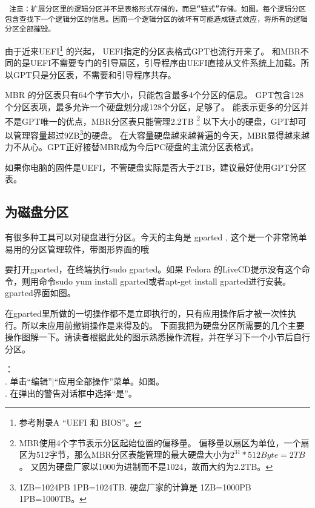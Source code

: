 \documentclass[amstex,twoside]{ctexbook}
\newenvironment{notice}{\tt}{}
\begin{document}
\begin{notice}
注意：扩展分区里的逻辑分区并不是表格形式存储的，而是“链式”存储。如图。每个逻辑分区包含查找下一个逻辑分区的信息。因而一个逻辑分区的破坏有可能造成链式效应，将所有的逻辑分区全部摧毁。
\end{notice}

由于近来UEFI\footnote{参考附录A “UEFI 和 BIOS”。}  的兴起，
UEFI指定的分区表格式GPT也流行开来了。
和MBR不同的是UEFI不需要专门的引导扇区，引导程序由UEFI直接从文件系统上加载。所以GPT只是分区表，不需要和引导程序共存。

MBR 的分区表只有64个字节大小，只能包含最多4个分区的信息。
GPT包含128个分区表项，最多允许一个硬盘划分成128个分区，足够了。
能表示更多的分区并不是GPT唯一的优点，MBR分区表只能管理2.2TB
\footnote{MBR使用4个字节表示分区起始位置的偏移量。
偏移量以扇区为单位，一个扇区为512字节，那么MBR分区表能管理的最大硬盘大小为$2^{31}*512Byte = 2TB$。
又因为硬盘厂家以1000为进制而不是1024，故而大约为2.2TB。}%
以下大小的硬盘，GPT却可以管理容量超过9ZB\footnote{1ZB=1024PB 1PB=1024TB. 硬盘厂家的计算是 1ZB=1000PB 1PB=1000TB。}的硬盘。
在大容量硬盘越来越普遍的今天，MBR显得越来越力不从心。GPT正好接替MBR成为今后PC硬盘的主流分区表格式。

如果你电脑的固件是UEFI，不管硬盘实际是否大于2TB，建议最好使用GPT分区表。

\subsection{为磁盘分区}


\FloatBarrier

\normalfont

有很多种工具可以对硬盘进行分区。今天的主角是 gparted , 这个是一个非常简单易用的分区管理软件，带图形界面的哦~~

要打开gparted，在终端执行sudo gparted。如果 Fedora 的LiveCD提示没有这个命令，则用命令sudo yum install gparted或者apt-get install gparted进行安装。gparted界面如图。

在gparted里所做的一切操作都不是立即执行的，只有应用操作后才被一次性执行。所以未应用前撤销操作是来得及的。
下面我把为硬盘分区所需要的几个主要操作图解一下。请读者根据此处的图示熟悉操作流程，并在学习下一个小节后自行分区。

：\\. 单击“编辑”|“应用全部操作”菜单。如图。\\. 在弹出的警告对话框中选择“是”。
\end{document}

